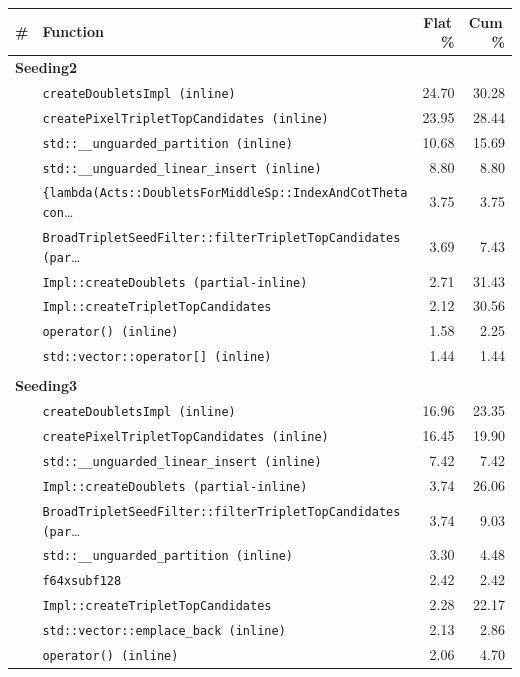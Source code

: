 \begin{tabular}{rlrr}
\toprule
\textbf{\#} & \textbf{Function} & \textbf{Flat\,\%} & \textbf{Cum\,\%} \\
\midrule
\multicolumn{4}{l}{\textbf{Seeding2}} \\
\quad & \texttt{createDoubletsImpl (inline)} & 24.70 & 30.28 \\
\quad & \texttt{createPixelTripletTopCandidates (inline)} & 23.95 & 28.44 \\
\quad & \texttt{std::\_\_unguarded\_partition (inline)} & 10.68 & 15.69 \\
\quad & \texttt{std::\_\_unguarded\_linear\_insert (inline)} & 8.80 & 8.80 \\
\quad & \texttt{\{lambda(Acts::DoubletsForMiddleSp::IndexAndCotTheta con}\ldots & 3.75 & 3.75 \\
\quad & \texttt{BroadTripletSeedFilter::filterTripletTopCandidates (par}\ldots & 3.69 & 7.43 \\
\quad & \texttt{Impl::createDoublets (partial-inline)} & 2.71 & 31.43 \\
\quad & \texttt{Impl::createTripletTopCandidates} & 2.12 & 30.56 \\
\quad & \texttt{operator() (inline)} & 1.58 & 2.25 \\
\quad & \texttt{std::vector::operator[] (inline)} & 1.44 & 1.44 \\
\\[-0.5em]
\multicolumn{4}{l}{\textbf{Seeding3}} \\
\quad & \texttt{createDoubletsImpl (inline)} & 16.96 & 23.35 \\
\quad & \texttt{createPixelTripletTopCandidates (inline)} & 16.45 & 19.90 \\
\quad & \texttt{std::\_\_unguarded\_linear\_insert (inline)} & 7.42 & 7.42 \\
\quad & \texttt{Impl::createDoublets (partial-inline)} & 3.74 & 26.06 \\
\quad & \texttt{BroadTripletSeedFilter::filterTripletTopCandidates (par}\ldots & 3.74 & 9.03 \\
\quad & \texttt{std::\_\_unguarded\_partition (inline)} & 3.30 & 4.48 \\
\quad & \texttt{f64xsubf128} & 2.42 & 2.42 \\
\quad & \texttt{Impl::createTripletTopCandidates} & 2.28 & 22.17 \\
\quad & \texttt{std::vector::emplace\_back (inline)} & 2.13 & 2.86 \\
\quad & \texttt{operator() (inline)} & 2.06 & 4.70 \\
\bottomrule
\end{tabular}
